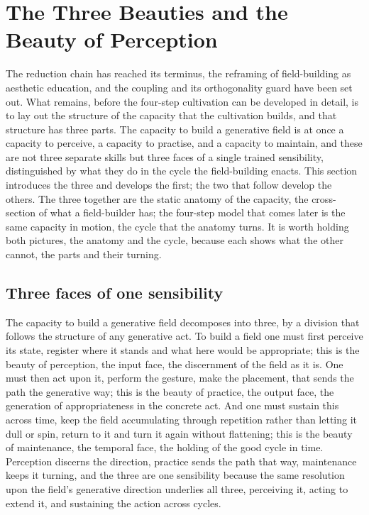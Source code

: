 \section{The Three Beauties and the Beauty of Perception}
\label{p22:sec:three-beauties}

\noindent
The reduction chain has reached its terminus, the reframing of field-building as aesthetic education, and the coupling and its orthogonality guard have been set out. What remains, before the four-step cultivation can be developed in detail, is to lay out the structure of the capacity that the cultivation builds, and that structure has three parts. The capacity to build a generative field is at once a capacity to perceive, a capacity to practise, and a capacity to maintain, and these are not three separate skills but three faces of a single trained sensibility, distinguished by what they do in the cycle the field-building enacts. This section introduces the three and develops the first; the two that follow develop the others. The three together are the static anatomy of the capacity, the cross-section of what a field-builder has; the four-step model that comes later is the same capacity in motion, the cycle that the anatomy turns. It is worth holding both pictures, the anatomy and the cycle, because each shows what the other cannot, the parts and their turning.

\subsection{Three faces of one sensibility}
\label{p22:sub:three-faces}

The capacity to build a generative field decomposes into three, by a division that follows the structure of any generative act. To build a field one must first perceive its state, register where it stands and what here would be appropriate; this is the beauty of perception, the input face, the discernment of the field as it is. One must then act upon it, perform the gesture, make the placement, that sends the path the generative way; this is the beauty of practice, the output face, the generation of appropriateness in the concrete act. And one must sustain this across time, keep the field accumulating through repetition rather than letting it dull or spin, return to it and turn it again without flattening; this is the beauty of maintenance, the temporal face, the holding of the good cycle in time. Perception discerns the direction, practice sends the path that way, maintenance keeps it turning, and the three are one sensibility because the same resolution upon the field's generative direction underlies all three, perceiving it, acting to extend it, and sustaining the action across cycles.

